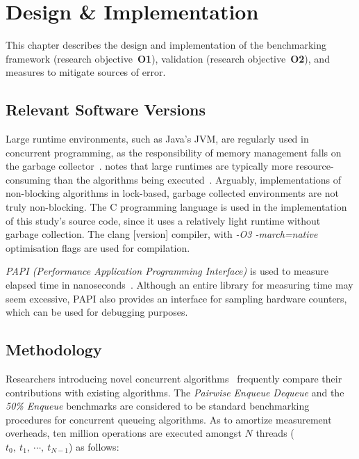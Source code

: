 \chapter{Design \& Implementation}
This chapter describes the design and 
implementation of the benchmarking framework  (research objective~\textbf{O1}),
validation (research objective~\textbf{O2}), and measures
to mitigate sources of error.

\section{Relevant Software Versions}
Large runtime environments, such as Java's JVM, are regularly used in concurrent
programming, as the responsibility of memory management falls on the garbage
collector~\citep{kogan2011wait}. \citeauthor{fog2020optimizing} notes that
large runtimes are typically more resource-consuming
than the algorithms being executed~\citep{fog2020optimizing}. Arguably,
implementations of non-blocking algorithms in lock-based, garbage collected
environments are not truly non-blocking. The C programming
language is used in the implementation of this study's source code, since it
uses a relatively light runtime without garbage collection. The
clang [version] compiler, with \emph{-O3 -march=native} optimisation flags
are used for compilation.

\emph{PAPI (Performance Application Programming Interface)} is used to measure
elapsed time in nanoseconds~\citep{terpstra2010papi}. Although an entire library for measuring time 
may seem excessive, PAPI also provides an interface for
sampling hardware counters, which can be used for debugging purposes.



\section{Methodology}

Researchers introducing novel concurrent
algorithms~\citep{michael1996simple,valois1994queues,kogan2011wait,hoffman2007baskets,yang2016wait}
frequently compare their contributions with existing algorithms. The
\emph{Pairwise Enqueue Dequeue} and the \emph{50\% Enqueue}
benchmarks are considered to be standard benchmarking procedures for concurrent
queueing algorithms. As to amortize measurement overheads, ten million operations are
executed amongst $N$ threads ($t_0,~t_1,~\cdots,~t_{N-1}$) as follows: 

